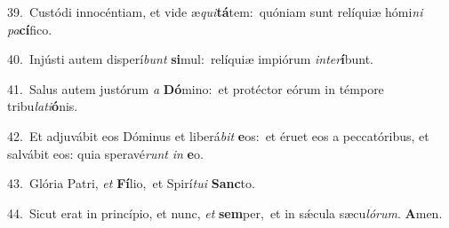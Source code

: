 {\numbfont\textcolor{\numbcolor}{39.}}~Custódi innocéntiam, et vide æ\-\textit{qui}\-\textbf{tá}tem:~\star quóniam sunt relíquiæ hómi\textit{ni} \textit{pa}\-\textbf{cí}fico.\par
{\numbfont\textcolor{\numbcolor}{40.}}~Injústi autem disperí\textit{bunt} \textbf{si}\-mul:~\star relíquiæ impiórum \textit{in}\-\textit{ter}\textbf{í}bunt.\par
{\numbfont\textcolor{\numbcolor}{41.}}~Salus autem justórum \textit{a} \textbf{Dó}\-mino:~\star et protéctor eórum in témpore tribu\-\textit{la}\-\textit{ti}\textbf{ó}nis.\par
{\numbfont\textcolor{\numbcolor}{42.}}~Et adjuvábit eos Dóminus et liberá\textit{bit} \textbf{e}\-os:~\star et éruet eos a peccatóribus, et salvábit eos: quia speravé\textit{runt} \textit{in} \textbf{e}\-o.\par
{\numbfont\textcolor{\numbcolor}{43.}}~Glória Patri, \textit{et} \textbf{Fí}\-lio,~\star et Spirí\-\textit{tu}\-\textit{i} \textbf{Sanc}\-to.\par
{\numbfont\textcolor{\numbcolor}{44.}}~Sicut erat in princípio, et nunc, \textit{et} \textbf{sem}\-per,~\star et in sǽcula sæcu\-\textit{ló}\-\textit{rum}. \textbf{A}\-men.\par
